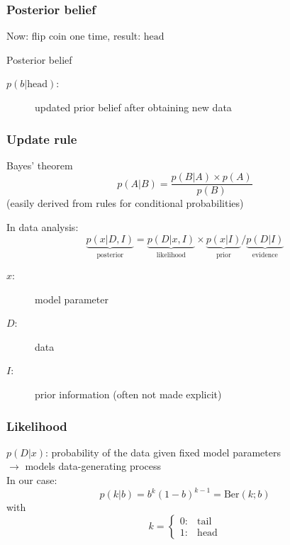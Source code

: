 \documentclass[t,aspectratio=169]{beamer}
\begin{document}
\begin{frame}
  \frametitle{Posterior belief}
  Now: flip coin one time, result: $\mathrm{head}$
  \begin{tcolorbox}{Posterior belief}
    \begin{description}
      \item[$p(b|\mathrm{head})$:] updated prior belief after obtaining new data
    \end{description}
  \end{tcolorbox}
  \vfill
  \centering
\end{frame}


\begin{frame}
  \frametitle{Update rule}
  \begin{tcolorbox}{Bayes' theorem}
    \begin{equation*}
      p(A|B) = \frac{p(B|A) \times p(A)}{p(B)}
    \end{equation*}
    (easily derived from rules for conditional probabilities)
  \end{tcolorbox}
  In data analysis:
  \begin{equation*}
    \underbrace{p(x|D,I)}_{\mathrm{posterior}} = \underbrace{p(D|x,I)}_{\mathrm{likelihood}} \times \underbrace{p(x|I)}_{\mathrm{prior}} / \underbrace{p(D|I)}_{\mathrm{evidence}}
  \end{equation*}
  \begin{description}
  \item[$x$:] model parameter
  \item[$D$:] data
  \item[$I$:] prior information (often not made explicit)
  \end{description}
\end{frame}


\begin{frame}
  \frametitle{Likelihood}
  $p(D|x)$: probability of the data given fixed model parameters\\
  $\rightarrow$ models data-generating process\\
  \bigbreak
  In our case:
  \begin{equation*}
    p(k|b) = b^k(1-b)^{k-1} = \mathrm{Ber}(k;b)
  \end{equation*}
  with
  \begin{equation*}
    k = \begin{cases} 0:& \mathrm{tail}\\
      1:& \mathrm{head}
    \end{cases}
  \end{equation*}
  \vfill
  \centering
\end{frame}
\end{document}

